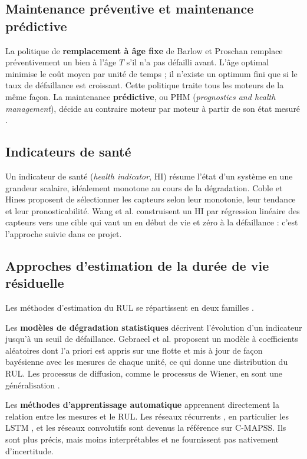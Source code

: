 \subsection{Maintenance préventive et maintenance prédictive}\label{sec:ea-maintenance}

La politique de \textbf{remplacement à âge fixe} de Barlow et Proschan \cite{barlow1965} remplace préventivement un bien à l'âge $T$ s'il n'a pas défailli avant. L'âge optimal minimise le coût moyen par unité de temps ; il n'existe un optimum fini que si le taux de défaillance est croissant. Cette politique traite tous les moteurs de la même façon. La maintenance \textbf{prédictive}, ou PHM (\emph{prognostics and health management}), décide au contraire moteur par moteur à partir de son état mesuré \cite{jardine2006,lei2018}.

\subsection{Indicateurs de santé}\label{sec:ea-hi}

Un indicateur de santé (\emph{health indicator}, HI) résume l'état d'un système en une grandeur scalaire, idéalement monotone au cours de la dégradation. Coble et Hines \cite{coble2009} proposent de sélectionner les capteurs selon leur monotonie, leur tendance et leur pronosticabilité. Wang et al. \cite{wang2008} construisent un HI par régression linéaire des capteurs vers une cible qui vaut un en début de vie et zéro à la défaillance : c'est l'approche suivie dans ce projet.

\subsection{Approches d'estimation de la durée de vie résiduelle}\label{sec:ea-rul}

Les méthodes d'estimation du RUL se répartissent en deux familles \cite{si2011,lei2018}.

Les \textbf{modèles de dégradation statistiques} décrivent l'évolution d'un indicateur jusqu'à un seuil de défaillance. Gebraeel et al. \cite{gebraeel2005} proposent un modèle à coefficients aléatoires dont l'a priori est appris sur une flotte et mis à jour de façon bayésienne avec les mesures de chaque unité, ce qui donne une distribution du RUL. Les processus de diffusion, comme le processus de Wiener, en sont une généralisation \cite{si2012}.

Les \textbf{méthodes d'apprentissage automatique} apprennent directement la relation entre les mesures et le RUL. Les réseaux récurrents \cite{heimes2008}, en particulier les LSTM \cite{hochreiter1997,zheng2017}, et les réseaux convolutifs \cite{babu2016,li2018} sont devenus la référence sur C-MAPSS. Ils sont plus précis, mais moins interprétables et ne fournissent pas nativement d'incertitude.

